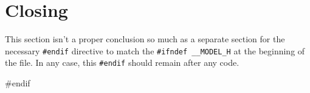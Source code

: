 \documentclass{article}
\begin{document}
  \section{Closing}

    This section isn't a proper conclusion so much as a separate section for the
    necessary \verb|#endif| directive to match the \verb|#ifndef __MODEL_H| at the beginning
    of the file. In any case, this \verb|#endif| should remain after any code.

\begin{ccode}
#endif
\end{ccode}
\end{document}
